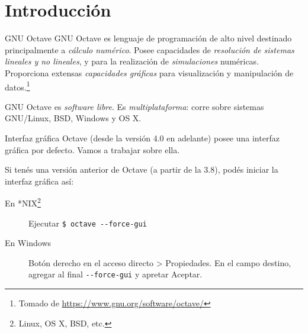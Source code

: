 \section{Introducción}

\begin{frame}[fragile]{GNU Octave}
  GNU Octave es lenguaje de programación de alto nivel destinado principalmente a \emph{cálculo numérico}. Posee capacidades de \emph{resolución de sistemas lineales y no lineales}, y para la realización de \emph{simulaciones} numéricas. Proporciona extensas \emph{capacidades gráficas} para visualización y manipulación de datos.\footnote{Tomado de \url{https://www.gnu.org/software/octave/}}
  
  GNU Octave es \emph{software libre}. Es \emph{multiplataforma}: corre sobre sistemas GNU/Linux, BSD, Windows y OS X.
\end{frame}

\begin{frame}[fragile]{Interfaz gráfica}
  Octave (desde la versión 4.0 en adelante) posee una interfaz gráfica por defecto. Vamos a trabajar sobre ella.
  
  Si tenés una versión anterior de Octave (a partir de la 3.8), podés iniciar la interfaz gráfica así:
  \begin{description}
    \item[En *NIX\footnote{Linux, OS X, BSD, etc.}] Ejecutar \verb!$ octave --force-gui!
    \item[En Windows] Botón derecho en el acceso directo > Propiedades. En el campo destino,   agregar al final \verb!--force-gui!  y apretar Aceptar.
  \end{description}
\end{frame}

